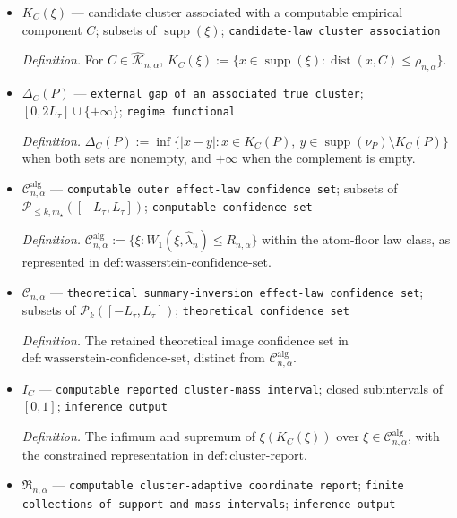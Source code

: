 \documentclass{article}
\begin{document}
\begin{itemize}
  \item \(K_C(\xi)\) --- candidate cluster associated with a computable empirical component \(C\); subsets of \(\operatorname{supp}(\xi)\); \texttt{candidate-\allowbreak{}law cluster association}
  \par\smallskip\noindent\emph{Definition.} For \(C\in\widehat{\mathscr K}_{n,\alpha}\), \(K_C(\xi):=\{x\in\operatorname{supp}(\xi):\operatorname{dist}(x,C)\le\rho_{n,\alpha}\}\).
  \item \(\Delta_C(P)\) --- \texttt{external gap of an associated true cluster}; \([0,2L_{\tau}]\cup\{+\infty\}\); \texttt{regime functional}
  \par\smallskip\noindent\emph{Definition.} \(\Delta_C(P):=\inf\{|x-y|:x\in K_C(P),\ y\in\operatorname{supp}(\nu_P)\setminus K_C(P)\}\) when both sets are nonempty, and \(+\infty\) when the complement is empty.
  \item \(\mathcal C^{\mathrm{alg}}_{n,\alpha}\) --- \texttt{computable outer effect-\allowbreak{}law confidence set}; subsets of \(\mathcal P_{\le k,m_\star}([-L_{\tau},L_{\tau}])\); \texttt{computable confidence set}
  \par\smallskip\noindent\emph{Definition.} \(\mathcal C^{\mathrm{alg}}_{n,\alpha}:=\{\xi:W_1(\xi,\widehat\lambda_n)\le R_{n,\alpha}\}\) within the atom-floor law class, as represented in \(\mathrm{def:wasserstein\text{-}confidence\text{-}set}\).
  \item \(\mathcal C_{n,\alpha}\) --- \texttt{theoretical summary-\allowbreak{}inversion effect-\allowbreak{}law confidence set}; subsets of \(\mathcal P_k([-L_{\tau},L_{\tau}])\); \texttt{theoretical confidence set}
  \par\smallskip\noindent\emph{Definition.} The retained theoretical image confidence set in \(\mathrm{def:wasserstein\text{-}confidence\text{-}set}\), distinct from \(\mathcal C^{\mathrm{alg}}_{n,\alpha}\).
  \item \(I_C\) --- \texttt{computable reported cluster-\allowbreak{}mass interval}; closed subintervals of \([0,1]\); \texttt{inference output}
  \par\smallskip\noindent\emph{Definition.} The infimum and supremum of \(\xi(K_C(\xi))\) over \(\xi\in\mathcal C^{\mathrm{alg}}_{n,\alpha}\), with the constrained representation in \(\mathrm{def:cluster\text{-}report}\).
  \item \(\mathfrak R_{n,\alpha}\) --- \texttt{computable cluster-\allowbreak{}adaptive coordinate report}; \texttt{finite collections of support and mass intervals}; \texttt{inference output}

\end{itemize}
\end{document}
